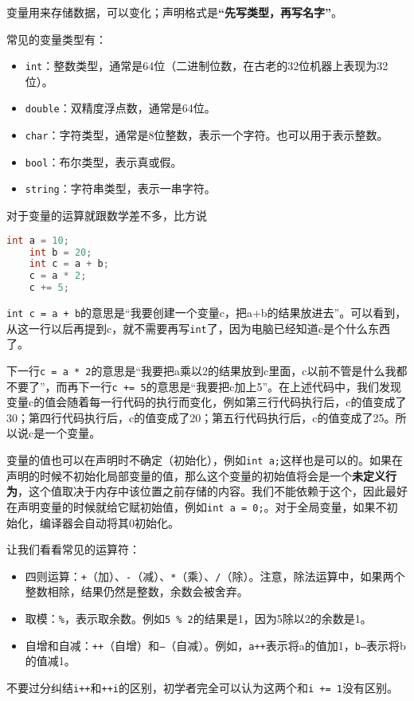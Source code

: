 \documentclass[../main.tex]{subfiles}
\begin{document}
变量用来存储数据，可以变化；声明格式是\textbf{“先写类型，再写名字”}。

常见的变量类型有：
\begin{itemize}
  \item \texttt{int}：整数类型，通常是64位（二进制位数，在古老的32位机器上表现为32位）。
  \item \texttt{double}：双精度浮点数，通常是64位。
  \item \texttt{char}：字符类型，通常是8位整数，表示一个字符。也可以用于表示整数。
  \item \texttt{bool}：布尔类型，表示真或假。
  \item \texttt{string}：字符串类型，表示一串字符。
\end{itemize}

对于变量的运算就跟数学差不多，比方说
\begin{lstlisting}[language=C++]
    int a = 10;
    int b = 20;
    int c = a + b;
    c = a * 2;
    c += 5;
\end{lstlisting}
\texttt{int c = a + b}的意思是“我要创建一个变量c，把a+b的结果放进去”。可以看到，从这一行以后再提到c，就不需要再写\texttt{int}了，因为电脑已经知道c是个什么东西了。

下一行\texttt{c = a * 2}的意思是“我要把a乘以2的结果放到c里面，c以前不管是什么我都不要了”，而再下一行\texttt{c += 5}的意思是“我要把c加上5”。在上述代码中，我们发现变量c的值会随着每一行代码的执行而变化，例如第三行代码执行后，c的值变成了30；第四行代码执行后，c的值变成了20；第五行代码执行后，c的值变成了25。所以说c是一个变量。

变量的值也可以在声明时不确定（初始化），例如\texttt{int a;}这样也是可以的。如果在声明的时候不初始化局部变量的值，那么这个变量的初始值将会是一个\textbf{未定义行为}，这个值取决于内存中该位置之前存储的内容。我们不能依赖于这个，因此最好在声明变量的时候就给它赋初始值，例如\texttt{int a = 0;}。对于全局变量，如果不初始化，编译器会自动将其0初始化。

让我们看看常见的运算符：
\begin{itemize}
  \item 四则运算：\texttt{+}（加）、\texttt{-}（减）、\texttt{*}（乘）、\texttt{/}（除）。注意，除法运算中，如果两个整数相除，结果仍然是整数，余数会被舍弃。
  \item 取模：\texttt{\%}，表示取余数。例如\texttt{5 \% 2}的结果是1，因为5除以2的余数是1。
  \item 自增和自减：\texttt{++}（自增）和\texttt{--}（自减）。例如，\texttt{a++}表示将a的值加1，\texttt{b--}表示将b的值减1。
\end{itemize}
不要过分纠结\texttt{i++}和\texttt{++i}的区别，初学者完全可以认为这两个和\texttt{i += 1}没有区别。
\end{document}
